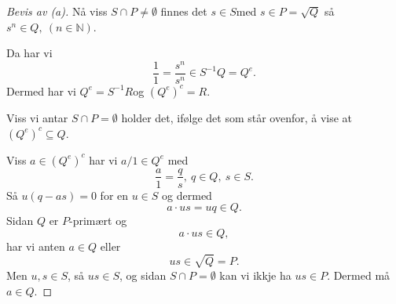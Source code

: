 \documentclass[11pt]{article}
\begin{document}
\begin{proof}[Bevis av (a)]
    Nå viss $S \cap P \neq \emptyset$ finnes 
    det $s \in S$med $s \in P = \sqrt Q$ så 
    $s^n \in Q, \ (n \in \mathbb N)$. 

    Da har vi 
    \[
        \frac11 = \frac{s^n}{s^n} \in S^{-1}Q = Q^e.
    \]
    Dermed har vi $Q^e = S^{-1}R$og $(Q^e)^c = R$. 

    Viss vi antar $S \cap P = \emptyset$ holder det, 
    ifølge det som står ovenfor, å vise at 
    $(Q^e)^c \subseteq Q$.
    
    Viss $a \in (Q^e)^c$ har vi $a/1 \in Q^e$ med 
    \[
        \frac a 1 = \frac q s, \ q \in Q, \ s \in S. 
    \]
    Så $u(q-as) = 0$ for en $u \in S$ og dermed 
    \[
        a \cdot us = uq \in Q. 
    \]
    Sidan $Q$ er $P$-primært og
    \[
        a\cdot us\in Q,
    \]
    har vi anten $a\in Q$ eller
    \[
        us\in\sqrt Q=P.
    \]
    Men $u,s\in S$, så $us\in S$, og sidan
    $S\cap P=\emptyset$ kan vi ikkje ha $us\in P$.
    Dermed må $a\in Q$.
\end{proof}
\end{document}
